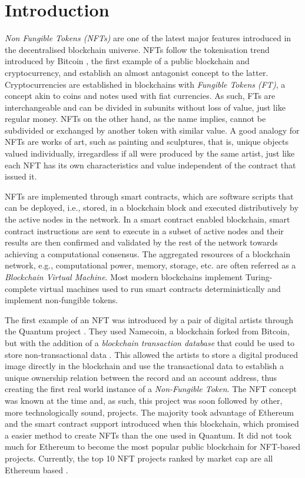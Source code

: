 \documentclass[../access.tex]{subfiles}
\begin{document}
\section{Introduction}
\label{sec:introduction}
\textit{Non Fungible Tokens (NFTs)} are one of the latest major features introduced in the decentralised blockchain universe. NFTs follow the tokenisation trend introduced by Bitcoin \cite{Nakamoto2008}, the first example of a public blockchain and cryptocurrency, and establish an almost antagonist concept to the latter. Cryptocurrencies are established in blockchains with \textit{Fungible Tokens (FT)}, a concept akin to coins and notes used with fiat currencies. As such, FTs are interchangeable and can be divided in subunits without loss of value, just like regular money. NFTs on the other hand, as the name implies, cannot be subdivided or exchanged by another token with similar value. A good analogy for NFTs are works of art, such as painting and sculptures, that is, unique objects valued individually, irregardless if all were produced by the same artist, just like each NFT has its own characteristics and value independent of the contract that issued it.
\par
NFTs are implemented through smart contracts, which are software scripts that can be deployed, i.e., stored, in a blockchain block and executed distributively by the active nodes in the network. In a smart contract enabled blockchain, smart contract instructions are sent to execute in a subset of active nodes and their results are then confirmed and validated by the rest of the network towards achieving a computational consensus. The aggregated resources of a blockchain network, e.g., computational power, memory, storage, etc. are often referred as a \textit{Blockchain Virtual Machine}. Most modern blockchains implement Turing-complete virtual machines used to run smart contracts deterministically and implement non-fungible tokens.
\par
The first example of an NFT was introduced by a pair of digital artists through the Quantum project \cite{Exmundo2023}. They used Namecoin, a blockchain forked from Bitcoin, but with the addition of a \textit{blockchain transaction database} that could be used to store non-transactional data \cite{Loibl2014}. This allowed the artists to store a digital produced image directly in the blockchain and use the transactional data to establish a unique ownership relation between the record and an account address, thus creating the first real world instance of a \textit{Non-Fungible Token}. The NFT concept was known at the time and, as such, this project was soon followed by other, more technologically sound, projects. The majority took advantage of Ethereum and the smart contract support introduced when this blockchain, which promised a easier method to create NFTs than the one used in Quantum. It did not took much for Ethereum to become the most popular public blockchain for NFT-based projects. Currently, the top 10 NFT projects ranked by market cap are all Ethereum based \cite{CoinGecko2024}.
\end{document}
